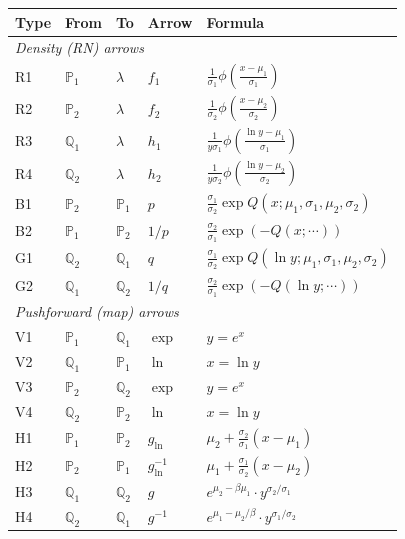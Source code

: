 \documentclass[11pt,a4paper]{article}
\begin{document}
\begin{center}
\renewcommand{\arraystretch}{1.4}
\begin{tabular}{lllll}
\toprule
\textbf{Type} & \textbf{From} & \textbf{To} & \textbf{Arrow} & \textbf{Formula} \\
\midrule
\multicolumn{5}{l}{\textit{Density (RN) arrows}} \\
R1 & $\mathbb{P}_1$ & $\lambda$ & $f_1$ & $\frac{1}{\sigma_1}\phi\!\left(\frac{x-\mu_1}{\sigma_1}\right)$ \\
R2 & $\mathbb{P}_2$ & $\lambda$ & $f_2$ & $\frac{1}{\sigma_2}\phi\!\left(\frac{x-\mu_2}{\sigma_2}\right)$ \\
R3 & $\mathbb{Q}_1$ & $\lambda$ & $h_1$ & $\frac{1}{y\sigma_1}\phi\!\left(\frac{\ln y-\mu_1}{\sigma_1}\right)$ \\
R4 & $\mathbb{Q}_2$ & $\lambda$ & $h_2$ & $\frac{1}{y\sigma_2}\phi\!\left(\frac{\ln y-\mu_2}{\sigma_2}\right)$ \\
B1 & $\mathbb{P}_2$ & $\mathbb{P}_1$ & $p$ & $\frac{\sigma_1}{\sigma_2}\exp Q(x;\mu_1,\sigma_1,\mu_2,\sigma_2)$ \\
B2 & $\mathbb{P}_1$ & $\mathbb{P}_2$ & $1/p$ & $\frac{\sigma_2}{\sigma_1}\exp(-Q(x;\cdots))$ \\
G1 & $\mathbb{Q}_2$ & $\mathbb{Q}_1$ & $q$ & $\frac{\sigma_1}{\sigma_2}\exp Q(\ln y;\mu_1,\sigma_1,\mu_2,\sigma_2)$ \\
G2 & $\mathbb{Q}_1$ & $\mathbb{Q}_2$ & $1/q$ & $\frac{\sigma_2}{\sigma_1}\exp(-Q(\ln y;\cdots))$ \\
\midrule
\multicolumn{5}{l}{\textit{Pushforward (map) arrows}} \\
V1 & $\mathbb{P}_1$ & $\mathbb{Q}_1$ & $\exp$ & $y=e^x$ \\
V2 & $\mathbb{Q}_1$ & $\mathbb{P}_1$ & $\ln$  & $x=\ln y$ \\
V3 & $\mathbb{P}_2$ & $\mathbb{Q}_2$ & $\exp$ & $y=e^x$ \\
V4 & $\mathbb{Q}_2$ & $\mathbb{P}_2$ & $\ln$  & $x=\ln y$ \\
H1 & $\mathbb{P}_1$ & $\mathbb{P}_2$ & $g_{\ln}$ & $\mu_2+\frac{\sigma_2}{\sigma_1}(x-\mu_1)$ \\
H2 & $\mathbb{P}_2$ & $\mathbb{P}_1$ & $g_{\ln}^{-1}$ & $\mu_1+\frac{\sigma_1}{\sigma_2}(x-\mu_2)$ \\
H3 & $\mathbb{Q}_1$ & $\mathbb{Q}_2$ & $g$ & $e^{\mu_2-\beta\mu_1}\cdot y^{\sigma_2/\sigma_1}$ \\
H4 & $\mathbb{Q}_2$ & $\mathbb{Q}_1$ & $g^{-1}$ & $e^{\mu_1-\mu_2/\beta}\cdot y^{\sigma_1/\sigma_2}$ \\

\end{tabular}
\end{center}
\end{document}
